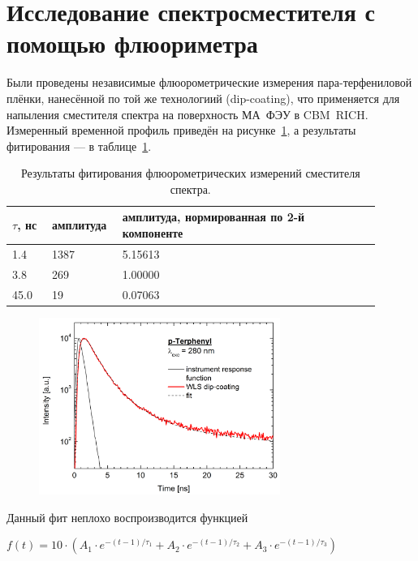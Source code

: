 \section{Исследование спектросместителя с помощью флюориметра}


Были проведены независимые флюорометрические измерения пара-тер\-фениловой плёнки, нанесённой по той же технологиий (dip-coating), что применяется для напыления сместителя спектра на поверхность МА~ФЭУ в CBM~RICH. Измеренный временной профиль приведён на рисунке~\ref{fig:MichaelProfile}, а результаты фитирования --- в таблице~\ref{tabl:MichaelValues}.

\begin{table}[H]
\caption{Результаты фитирования флюорометрических измерений сместителя спектра.}
\label{tabl:MichaelValues}
\begin{tabular}{ | p{0.1\linewidth} | p{0.15\linewidth} | p{0.65\linewidth} | }
	\hline
		$ \tau $, нс & амплитуда & амплитуда, нормированная по 2-й компоненте \\
	\hline
		1.4 & 1387 & 5.15613 \\
	\hline
		3.8 & 269 & 1.00000 \\
	\hline
		45.0 & 19 & 0.07063 \\
	\hline
\end{tabular}
\end{table}

\begin{figure}[H]
\includegraphics[width=0.7\textwidth]{pictures/Tau_fluoro_WLS_JLU.png}
\caption{}
\label{fig:MichaelProfile}
\end{figure}

Данный фит неплохо воспроизводится функцией

{\centering
$ f(t) = 10 \cdot ( A_{1} \cdot e^{-(t-1) / \tau_{1}} + A_{2} \cdot e^{-(t-1) / \tau_{2}} + A_{3} \cdot e^{-(t-1) / \tau_{3}} ) $ \\
}

